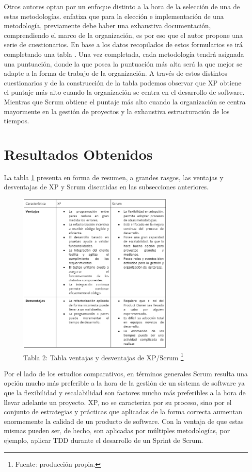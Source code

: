 \documentclass[a4paper,10pt]{article}
\begin{document}
	Otros autores optan por un enfoque distinto a la hora de la selección de una de estas metodologías. \textcite{perez2012guia} enfatiza que para la elección e implementación de una metodología, previamente debe haber una exhaustiva documentación, comprendiendo el marco de la organización, es por eso que el autor propone una serie de cuestionarios. En base a los datos recopilados de estos formularios se irá completando una tabla \parencite[61-67]{perez2012guia}. Una vez completada, cada metodología tendrá asignada una puntuación, donde la que posea la puntuación más alta será la que mejor se adapte a la forma de trabajo de la organización. A través de estos distintos cuestionarios y de la construcción de la tabla podemos observar que XP obtiene el puntaje más alto cuando la organización se centra en el desarrollo de software. Mientras que Scrum obtiene el puntaje más alto cuando la organización se centra mayormente en la gestión de proyectos y la exhaustiva estructuración de los tiempos.
	
	\section{Resultados Obtenidos}
	La tabla \ref{tabla_ventajas_desventajas} presenta en forma de resumen, a grandes rasgos, las ventajas y desventajas de XP y Scrum discutidas en las subsecciones anteriores.
	\begin{figure}[h]
		\centering
		\includegraphics[width=0.7\textwidth]{tablaVentajasDesventajas.PNG}
		\caption[Tabla ventajas y desventajas]{Tabla 2: Tabla ventajas y desventajas de XP/Scrum \footnote{Fuente: producción propia.}}
		\label{tabla_ventajas_desventajas}
	\end{figure}
	Por el lado de los estudios comparativos, en términos generales Scrum resulta una opción mucho más preferible a la hora de la gestión de un sistema de software ya que la flexibilidad y escalabilidad son factores mucho más preferibles a la hora de llevar adelante un proyecto. XP, no se caracteriza por su proceso, sino por el conjunto de estrategias y prácticas que aplicadas de la forma correcta aumentan enormemente la calidad de un producto de software. Con la ventaja de que estas mismas pueden ser, de hecho, son aplicadas por múltiples metodologías, por ejemplo, aplicar TDD durante el desarrollo de un Sprint de Scrum.
\end{document}
